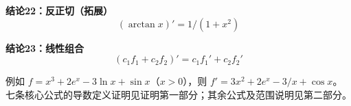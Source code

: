 \begin{statementbox}
\begin{minipage}{\linewidth}
\textbf{结论22：反正切（拓展）}
\[
(\arctan x)'=1/(1+x^2)
\]

\end{minipage}
\end{statementbox}

\begin{statementbox}
\begin{minipage}{\linewidth}
\textbf{结论23：线性组合}
\[
(c_1f_1+c_2f_2)'=c_1f_1'+c_2f_2'
\]

\end{minipage}
例如 $f=x^3+2e^x-3\ln x+\sin x$（$x>0$），则 $f\prime=3x^2+2e^x-3/x+\cos x$。
七条核心公式的导数定义证明见证明第一部分；其余公式及范围说明见第二部分。
\end{statementbox}

